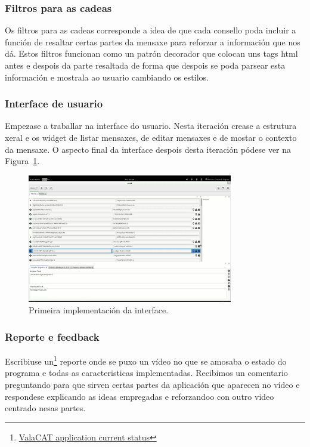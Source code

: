 \subsubsection{Filtros para as cadeas}
Os filtros para as cadeas corresponde a idea de que cada consello poda incluir a función de resaltar certas partes da mensaxe para reforzar a información que nos dá. Estos filtros funcionan como un patrón decorador que colocan uns tags html antes e despois da parte resaltada de forma que despois se poda parsear esta información e mostrala ao usuario cambiando os estilos.

\subsubsection{Interface de usuario}
Empezase a traballar na interface do usuario. Nesta iteración crease a estrutura xeral e os widget de listar mensaxes, de editar mensaxes e de mostar o contexto da mensaxe. O aspecto final da interface despois desta iteración pódese ver na Figura~\ref{fig:gsoc1_iter2_ui}.

\begin{figure}[h]
    \centering
    \includegraphics[width=0.8\textwidth]{img/gsoc1_it2_ui.png}
    \caption{Primeira implementación da interface.}
    \label{fig:gsoc1_iter2_ui}
\end{figure}

\subsubsection{Reporte e feedback}
Escribiuse un\footnote{\href{http://aquelando.info/valacat-application-current-status/}{ValaCAT application current status}} reporte onde se puxo un vídeo no que se amosaba o estado do programa e todas as caracteristicas implementadas. Recibimos un comentario preguntando para que sirven certas partes da aplicación que aparecen no vídeo e respondese explicando as ideas empregadas e reforzandoo con outro video centrado nesas partes.

